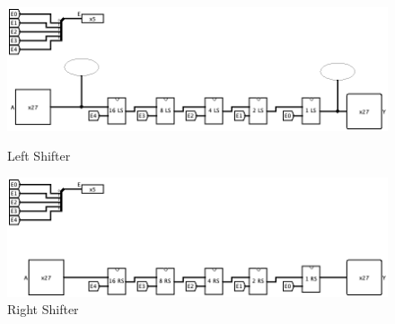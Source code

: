 \documentclass{article}
\begin{document}
\begin{figure}[h!]
    \centering
    \begin{minipage}{0.45\textwidth}
        \centering
        \includegraphics[width=\textwidth]{left_shifter} %
        \caption{Left Shifter}
        \label{fig:image1}
    \end{minipage}\hfill
    \begin{minipage}{0.45\textwidth}
        \centering
        \includegraphics[width=\textwidth]{right_shifter} %
        \caption{Right Shifter}
        \label{fig:image2}
    \end{minipage}
\end{figure}
\end{document}
